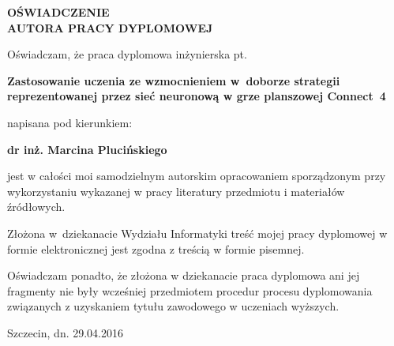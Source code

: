 % 

\begin{center}
\textbf{\large OŚWIADCZENIE \\AUTORA PRACY DYPLOMOWEJ}
\end{center}

\noindent Oświadczam, że praca dyplomowa inżynierska pt.

\noindent \textbf{Zastosowanie uczenia ze wzmocnieniem w~doborze strategii reprezentowanej przez sieć neuronową w grze planszowej Connect~4}

\noindent napisana pod kierunkiem:

\noindent \textbf{dr inż. Marcina Plucińskiego}

\noindent jest w całości moi samodzielnym autorskim opracowaniem sporządzonym przy wykorzystaniu wykazanej w pracy literatury przedmiotu i materiałów źródłowych.
\vspace{.5cm }

\noindent Złożona w~dziekanacie Wydziału Informatyki treść mojej pracy dyplomowej w formie elektronicznej jest zgodna z treścią w formie pisemnej.

\vspace{1cm }
\noindent Oświadczam ponadto, że złożona w dziekanacie praca dyplomowa ani jej fragmenty nie były wcześniej przedmiotem procedur procesu dyplomowania związanych z uzyskaniem tytułu zawodowego w uczeniach wyższych.
\vspace{1cm }


\flushleft 
\vspace{1cm }
Szczecin, dn. 29.04.2016
